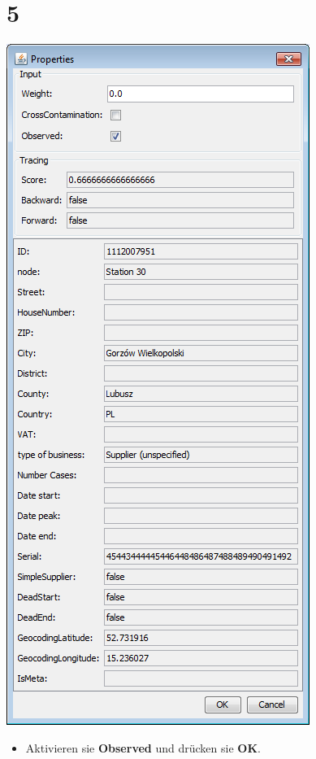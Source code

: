 \documentclass{beamer}
\begin{document}
\section{5}
\begin{frame}
	\begin{center}
  		\includegraphics[height=0.6\textheight]{5.png}
	\end{center}
	\begin{itemize}
		\item Aktivieren sie \textbf{Observed} und drücken sie \textbf{OK}.
	\end{itemize}
\end{frame}
\end{document}

